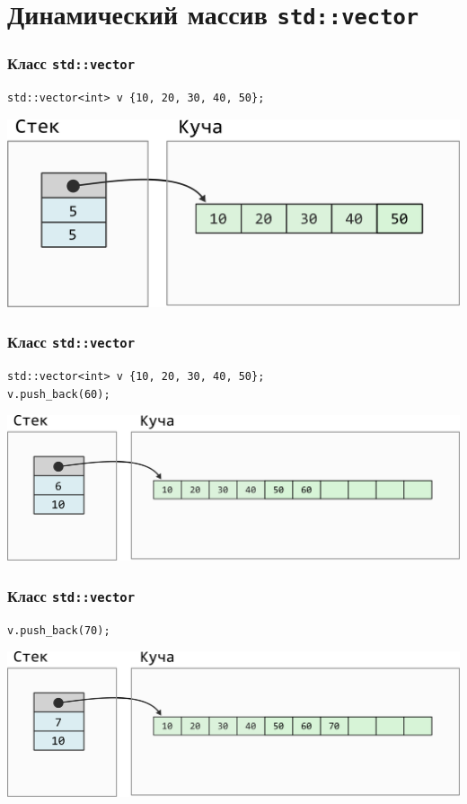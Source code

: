 \documentclass[10pt,pdf,hyperref={unicode}]{beamer}
\begin{document}
\section{Динамический массив \texttt{std::vector}}

\begin{frame}[fragile]
\frametitle{Класс \texttt{std::vector}}
\begin{lstlisting}
std::vector<int> v {10, 20, 30, 40, 50};
\end{lstlisting}
\begin{center}
\includegraphics[scale=0.6]{images/dynamic_array/vector_implementation1.png}
\end{center}
\end{frame}


\begin{frame}[fragile]
\frametitle{Класс \texttt{std::vector}}
\begin{lstlisting}
std::vector<int> v {10, 20, 30, 40, 50};
v.push_back(60);
\end{lstlisting}
\begin{center}
\includegraphics[scale=0.6]{images/dynamic_array/vector_implementation2.png}
\end{center}
\end{frame}


\begin{frame}[fragile]
\frametitle{Класс \texttt{std::vector}}
\begin{lstlisting}
v.push_back(70);
\end{lstlisting}
\begin{center}
\includegraphics[scale=0.6]{images/dynamic_array/vector_implementation3.png}
\end{center}
\end{frame}
\end{document}
